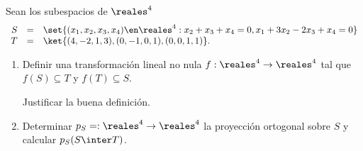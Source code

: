 \begin{enunciado}{\ejExtra}
  Sean los subespacios de $\reales^4$
  $$
    \begin{array}{rcl}
      S & = & \set{(x_1, x_2, x_3, x_4) \en \reales^4 : x_2 + x_3 + x_4 = 0, x_1 + 3x_2 - 2x_3 + x_4 = 0} \\
      T & = & \ket{(4, -2, 1, 3), (0, -1, 0, 1), (0,0,1,1)}.
    \end{array}
  $$
  \begin{enumerate}[label=\alph*)]
    \item Definir una transformación lineal no nula $f: \reales^4 \to \reales^4$ tal que $f(S) \subseteq T$ y
          $f(T) \subseteq S$.

          Justificar la buena definición.

    \item Determinar $p_S = : \reales^4 \to \reales^4$ la proyección ortogonal sobre $S$ y calcular $p_S(S \inter T)$.
  \end{enumerate}
\end{enunciado}


